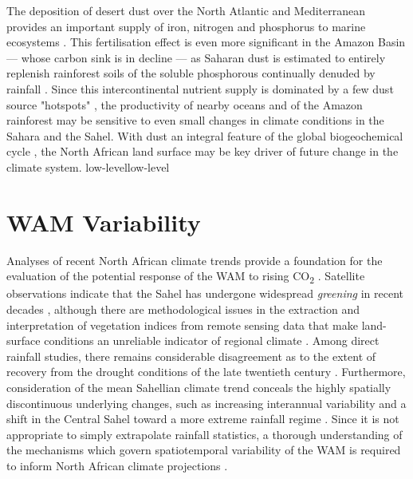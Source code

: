 \documentclass[a4paper]{article}
\begin{document}
The deposition of desert dust over the North Atlantic and Mediterranean provides an important supply of iron, nitrogen and phosphorus to marine ecosystems \parencite{prospero1996saharan, prospero1996atmospheric, guieu2002chemical, mills2004iron, bristow2010fertilizing, okin2011impacts}.
This fertilisation effect is even more significant in the Amazon Basin --- whose carbon sink is in decline \parencite{brienen2015long} --- as Saharan dust is estimated to entirely replenish rainforest soils of the soluble phosphorous continually denuded by rainfall \parencite{swap1992saharan, bristow2010fertilizing, yu2015fertilizing}.
Since this intercontinental nutrient supply is dominated by a few dust source "hotspots" \parencite{koren2006bodele, ben2010transport, schepanski2009saharan, knippertz2010central}, the productivity of nearby oceans and of the Amazon rainforest may be sensitive to even small changes in climate conditions in the Sahara and the Sahel.
With dust an integral feature of the global biogeochemical cycle \parencite{ridgwell2002dust, harrison2001role, jickells2005global, mahowald2005atmospheric}, the North African land surface may be key driver of future change in the climate system.
low-levellow-level  
\section{WAM Variability}
Analyses of recent North African climate trends provide a foundation for the evaluation of the potential response of the WAM to rising CO\textsubscript{2} \parencite{redelsperger2006african}. 
Satellite observations indicate that the Sahel has undergone widespread \emph{greening} in recent decades \parencite{olsson2005recent, dardel2014re}, although there are methodological issues in the extraction and interpretation of vegetation indices from remote sensing data that make land-surface conditions an unreliable indicator of regional climate \parencite{fensholt2013assessing, dardel2014rain}.
Among direct rainfall studies, there remains considerable disagreement as to the extent of recovery from the drought conditions of the late twentieth century \parencite{nicholson2005question, nicholson2013west}.
Furthermore, consideration of the mean Sahellian climate trend conceals the highly spatially discontinuous underlying changes, such as increasing interannual variability and a shift in the Central Sahel toward a more extreme rainfall regime \parencite{nicholson2013west, lebel2009recent, panthou2014recent}.
Since it is not appropriate to simply extrapolate rainfall statistics, a thorough understanding of the mechanisms which govern spatiotemporal variability of the WAM is required to inform North African climate projections \parencite{redelsperger2006african}.
\end{document}
